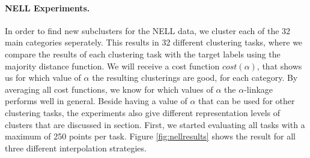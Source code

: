 \paragraph{NELL Experiments.} In order to find new subclusters for the NELL data, we cluster each of the 32 main categories seperately. This results in 32 different clustering tasks, where we compare the results of each clustering task with the target labels using the majority distance function. We will receive a cost function $cost(\alpha)$, that shows us for which value of $\alpha$ the resulting clusterings are good, for each category. By averaging all cost functions, we know for which values of $\alpha$ the $\alpha$-linkage performs well in general. Beside having a value of $\alpha$ that can be used for other clustering tasks, the experiments also give different representation levels of clusters that are discussed in section. First, we started evaluating all tasks with a maximum of 250 points per task. Figure \ref{fig:nellresults} shows the result for all three different interpolation strategies.


